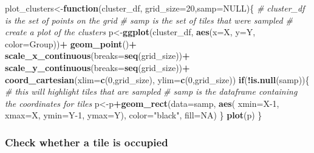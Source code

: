 \documentclass[
]{article}
\newenvironment{Shaded}{\begin{snugshade}}{\end{snugshade}}
\newcommand{\AttributeTok}[1]{\textcolor[rgb]{0.13,0.29,0.53}{#1}}
\newcommand{\CommentTok}[1]{\textcolor[rgb]{0.56,0.35,0.01}{\textit{#1}}}
\newcommand{\ConstantTok}[1]{\textcolor[rgb]{0.56,0.35,0.01}{#1}}
\newcommand{\ControlFlowTok}[1]{\textcolor[rgb]{0.13,0.29,0.53}{\textbf{#1}}}
\newcommand{\DecValTok}[1]{\textcolor[rgb]{0.00,0.00,0.81}{#1}}
\newcommand{\FunctionTok}[1]{\textcolor[rgb]{0.13,0.29,0.53}{\textbf{#1}}}
\newcommand{\NormalTok}[1]{#1}
\newcommand{\OtherTok}[1]{\textcolor[rgb]{0.56,0.35,0.01}{#1}}
\newcommand{\SpecialCharTok}[1]{\textcolor[rgb]{0.81,0.36,0.00}{\textbf{#1}}}
\newcommand{\StringTok}[1]{\textcolor[rgb]{0.31,0.60,0.02}{#1}}
\begin{document}
\begin{Shaded}
\begin{Highlighting}[]
\NormalTok{plot\_clusters}\OtherTok{\textless{}{-}}\ControlFlowTok{function}\NormalTok{(cluster\_df, }\AttributeTok{grid\_size=}\DecValTok{20}\NormalTok{,}\AttributeTok{samp=}\ConstantTok{NULL}\NormalTok{)\{}
  \CommentTok{\# cluster\_df is the set of points on the grid}
  \CommentTok{\# samp is the set of tiles that were sampled}
  \CommentTok{\# create a plot of the clusters}
\NormalTok{  p}\OtherTok{\textless{}{-}}\FunctionTok{ggplot}\NormalTok{(cluster\_df, }\FunctionTok{aes}\NormalTok{(}\AttributeTok{x=}\NormalTok{X, }\AttributeTok{y=}\NormalTok{Y, }\AttributeTok{color=}\NormalTok{Group))}\SpecialCharTok{+}
    \FunctionTok{geom\_point}\NormalTok{()}\SpecialCharTok{+}
    \FunctionTok{scale\_x\_continuous}\NormalTok{(}\AttributeTok{breaks=}\FunctionTok{seq}\NormalTok{(grid\_size))}\SpecialCharTok{+}
    \FunctionTok{scale\_y\_continuous}\NormalTok{(}\AttributeTok{breaks=}\FunctionTok{seq}\NormalTok{(grid\_size))}\SpecialCharTok{+}
    \FunctionTok{coord\_cartesian}\NormalTok{(}\AttributeTok{xlim=}\FunctionTok{c}\NormalTok{(}\DecValTok{0}\NormalTok{,grid\_size), }\AttributeTok{ylim=}\FunctionTok{c}\NormalTok{(}\DecValTok{0}\NormalTok{,grid\_size))}
  \ControlFlowTok{if}\NormalTok{(}\SpecialCharTok{!}\FunctionTok{is.null}\NormalTok{(samp))\{}
    \CommentTok{\# this will highlight tiles that are sampled}
    \CommentTok{\# samp is the dataframe containing the coordinates for tiles}
\NormalTok{    p}\OtherTok{\textless{}{-}}\NormalTok{p}\SpecialCharTok{+}\FunctionTok{geom\_rect}\NormalTok{(}\AttributeTok{data=}\NormalTok{samp, }
                   \FunctionTok{aes}\NormalTok{( }\AttributeTok{xmin=}\NormalTok{X}\DecValTok{{-}1}\NormalTok{, }\AttributeTok{xmax=}\NormalTok{X, }\AttributeTok{ymin=}\NormalTok{Y}\DecValTok{{-}1}\NormalTok{, }\AttributeTok{ymax=}\NormalTok{Y),}
                   \AttributeTok{color=}\StringTok{"black"}\NormalTok{,}
                   \AttributeTok{fill=}\ConstantTok{NA}\NormalTok{)}
\NormalTok{  \}}
  \FunctionTok{plot}\NormalTok{(p)}
\NormalTok{\}}
\end{Highlighting}
\end{Shaded}

\subsubsection{Check whether a tile is
occupied}\label{check-whether-a-tile-is-occupied}
\end{document}
